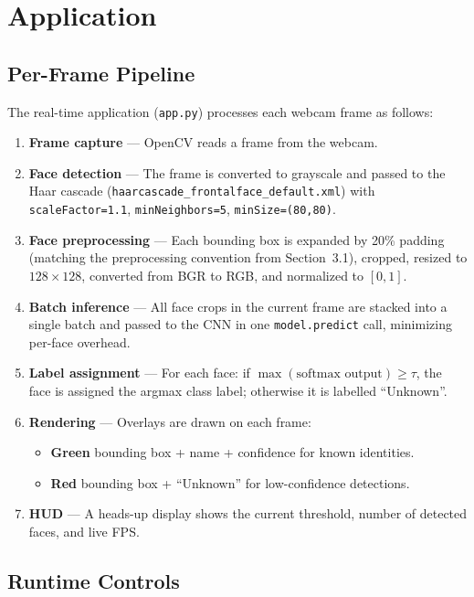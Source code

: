 \documentclass[12pt,a4paper]{article}
\begin{document}
\section{Application}

\subsection{Per-Frame Pipeline}

The real-time application (\texttt{app.py}) processes each webcam frame as follows:

\begin{enumerate}
  \item \textbf{Frame capture} — OpenCV reads a frame from the webcam.
  \item \textbf{Face detection} — The frame is converted to grayscale and passed to the Haar cascade (\texttt{haarcascade\_frontalface\_default.xml}) with \texttt{scaleFactor=1.1}, \texttt{minNeighbors=5}, \texttt{minSize=(80,80)}.
  \item \textbf{Face preprocessing} — Each bounding box is expanded by 20\% padding (matching the preprocessing convention from Section~3.1), cropped, resized to $128 \times 128$, converted from BGR to RGB, and normalized to $[0,1]$.
  \item \textbf{Batch inference} — All face crops in the current frame are stacked into a single batch and passed to the CNN in one \texttt{model.predict} call, minimizing per-face overhead.
  \item \textbf{Label assignment} — For each face: if $\max(\text{softmax output}) \geq \tau$, the face is assigned the argmax class label; otherwise it is labelled ``Unknown''.
  \item \textbf{Rendering} — Overlays are drawn on each frame:
    \begin{itemize}[noitemsep]
      \item \textbf{Green} bounding box + name + confidence for known identities.
      \item \textbf{Red} bounding box + ``Unknown'' for low-confidence detections.
    \end{itemize}
  \item \textbf{HUD} — A heads-up display shows the current threshold, number of detected faces, and live FPS.
\end{enumerate}

\subsection{Runtime Controls}
\end{document}
